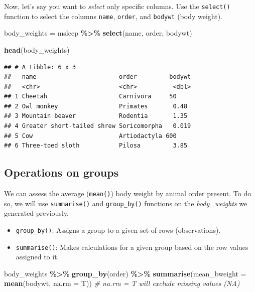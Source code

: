 \documentclass[
]{book}
\newenvironment{Shaded}{\begin{snugshade}}{\end{snugshade}}
\newcommand{\AttributeTok}[1]{\textcolor[rgb]{0.13,0.29,0.53}{#1}}
\newcommand{\CommentTok}[1]{\textcolor[rgb]{0.56,0.35,0.01}{\textit{#1}}}
\newcommand{\FunctionTok}[1]{\textcolor[rgb]{0.13,0.29,0.53}{\textbf{#1}}}
\newcommand{\NormalTok}[1]{#1}
\newcommand{\OtherTok}[1]{\textcolor[rgb]{0.56,0.35,0.01}{#1}}
\newcommand{\SpecialCharTok}[1]{\textcolor[rgb]{0.81,0.36,0.00}{\textbf{#1}}}
\providecommand{\tightlist}{%
  \setlength{\itemsep}{0pt}\setlength{\parskip}{0pt}}
\begin{document}
Now, let's say you want to \emph{select} only specific columns.
Use the \texttt{select()} function to select the columns \texttt{name}, \texttt{order}, and \texttt{bodywt} (body weight).

\begin{Shaded}
\begin{Highlighting}[]
\NormalTok{body\_weights }\OtherTok{=}\NormalTok{ msleep }\SpecialCharTok{\%\textgreater{}\%}
  \FunctionTok{select}\NormalTok{(name, order, bodywt)}

\FunctionTok{head}\NormalTok{(body\_weights)}
\end{Highlighting}
\end{Shaded}

\begin{verbatim}
## # A tibble: 6 x 3
##   name                       order         bodywt
##   <chr>                      <chr>          <dbl>
## 1 Cheetah                    Carnivora     50    
## 2 Owl monkey                 Primates       0.48 
## 3 Mountain beaver            Rodentia       1.35 
## 4 Greater short-tailed shrew Soricomorpha   0.019
## 5 Cow                        Artiodactyla 600    
## 6 Three-toed sloth           Pilosa         3.85
\end{verbatim}

\hypertarget{operations-on-groups}{%
\subsection*{Operations on groups}\label{operations-on-groups}}

We can assess the average (\texttt{mean()}) body weight by animal order present.
To do so, we will use \texttt{summarise()} and \texttt{group\_by()} functions on the \emph{body\_weights} we generated previously.

\begin{itemize}
\tightlist
\item
  \texttt{group\_by()}: Assigns a group to a given set of rows (observations).\\
\item
  \texttt{summarise()}: Makes calculations for a given group based on the row values assigned to it.
\end{itemize}

\begin{Shaded}
\begin{Highlighting}[]
\NormalTok{body\_weights }\SpecialCharTok{\%\textgreater{}\%} 
  \FunctionTok{group\_by}\NormalTok{(order) }\SpecialCharTok{\%\textgreater{}\%}
  \FunctionTok{summarise}\NormalTok{(}\AttributeTok{mean\_bweight =} \FunctionTok{mean}\NormalTok{(bodywt, }\AttributeTok{na.rm =}\NormalTok{ T)) }\CommentTok{\# na.rm = T will exclude missing values (NA)}
\end{Highlighting}
\end{Shaded}
\end{document}
